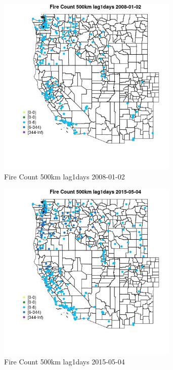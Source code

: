 \begin{figure} 
\centering  
\includegraphics[width=0.77\textwidth]{Code_Outputs/Report_ML_input_PM25_Step4_part_e_de_duplicated_aves_compiled_2019-05-18wNAs_MapObsFire_Count_500km_lag1days2008-01-02.jpg} 
\caption{\label{fig:Report_ML_input_PM25_Step4_part_e_de_duplicated_aves_compiled_2019-05-18wNAsMapObsFire_Count_500km_lag1days2008-01-02}Fire Count 500km lag1days 2008-01-02} 
\end{figure} 
 

\begin{figure} 
\centering  
\includegraphics[width=0.77\textwidth]{Code_Outputs/Report_ML_input_PM25_Step4_part_e_de_duplicated_aves_compiled_2019-05-18wNAs_MapObsFire_Count_500km_lag1days2015-05-04.jpg} 
\caption{\label{fig:Report_ML_input_PM25_Step4_part_e_de_duplicated_aves_compiled_2019-05-18wNAsMapObsFire_Count_500km_lag1days2015-05-04}Fire Count 500km lag1days 2015-05-04} 
\end{figure} 
 


